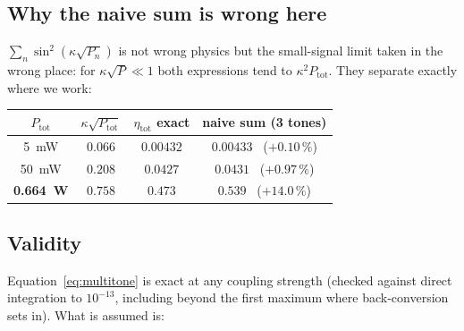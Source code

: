 \documentclass[11pt,a4paper]{article}
\begin{document}
\subsection{Why the naive sum is wrong here}
$\sum_n\sin^2(\kappa\sqrt{P_n})$ is not wrong physics but the small-signal
limit taken in the wrong place: for $\kappa\sqrt P\ll1$ both expressions tend
to $\kappa^2P_\mathrm{tot}$. They separate exactly where we work:

\begin{center}\small
\begin{tabular}{cccc}
\toprule
$P_\mathrm{tot}$ & $\kappa\sqrt{P_\mathrm{tot}}$ & $\eta_\mathrm{tot}$ exact
 & naive sum (3 tones)\\
\midrule
\SI{5}{\milli\watt} & $0.066$ & $0.00432$ & $0.00433$ \ ($+0.10\,\%$)\\
\SI{50}{\milli\watt} & $0.208$ & $0.0427$ & $0.0431$ \ ($+0.97\,\%$)\\
\textbf{\SI{0.664}{\watt}} & $0.758$ & $\mathbf{0.473}$ & $0.539$ \ ($\mathbf{+14.0\,\%}$)\\
\bottomrule
\end{tabular}
\end{center}

\subsection{Validity}
Equation~\eqref{eq:multitone} is exact at any coupling strength (checked
against direct integration to $10^{-13}$, including beyond the first maximum
where back-conversion sets in). What is assumed is:
\end{document}
